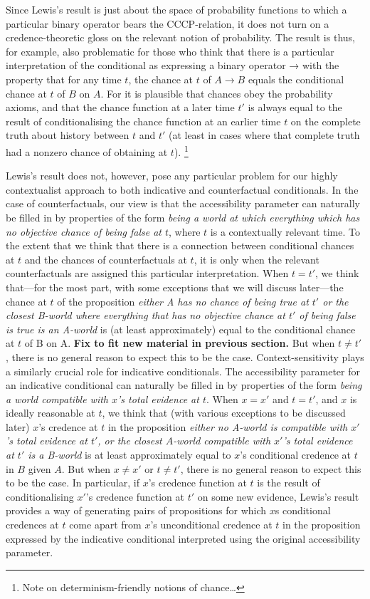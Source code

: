\documentclass[leqno, 11pt, a5paper, openany]{article}
\begin{document}
Since Lewis's result is just about the space of probability functions to which a particular binary operator bears the CCCP-relation, it does not turn on a credence-theoretic gloss on the relevant notion of probability. The result is thus, for example, also problematic for those who think that there is a particular interpretation of the conditional as expressing a binary operator → with the property that for any time $t$, the chance at $t$ of $A→B$ equals the conditional chance at $t$ of $B$ on $A$. For it is plausible that chances obey the probability axioms, and that the chance function at a later time $t'$ is always equal to the result of conditionalising the chance function at an earlier time $t$ on the complete truth about history between $t$ and $t'$ (at least in cases where that complete truth had a nonzero chance of obtaining at $t$).%
\footnote{Note on determinism-friendly notions of chance\ldots{}}

Lewis's result does not, however, pose any particular problem for our highly contextualist approach to both indicative and counterfactual conditionals. In the case of counterfactuals, our view is that the accessibility parameter can naturally be filled in by properties of the form \emph{being a world at which everything which has no objective chance of being false at $t$}, where $t$ is a contextually relevant time. To the extent that we think that there is a connection between conditional chances at $t$ and the chances of counterfactuals at $t$, it is only when the relevant counterfactuals are assigned this particular interpretation. When $t=t'$, we think that---for the most part, with some exceptions that we will discuss later---the chance at $t$ of the proposition \emph{either A has no chance of being true at $t'$ or the closest B-world where everything that has no objective chance at $t'$ of being false is true is an A-world} is (at least approximately) equal to the conditional chance at $t$ of B on A. \textbf{Fix to fit new material in previous section.}  But when $t≠t'$, there is no general reason to expect this to be the case. Context-sensitivity plays a similarly crucial role for indicative conditionals. The accessibility parameter for an indicative conditional can naturally be filled in by properties of the form \emph{being a world compatible with $x$'s total evidence at $t$}. When $x = x'$ and $t = t'$, and $x$ is ideally reasonable at $t$, we think that (with various exceptions to be discussed later) $x$'s credence at $t$ in the proposition \emph{either no A-world is compatible with $x'$'s total evidence at $t'$, or the closest $A$-world compatible with $x'$'s total evidence at $t'$ is a B-world} is at least approximately equal to $x$'s conditional credence at $t$ in $B$ given $A$. But when $x≠x'$ or $t≠t'$, there is no general reason to expect this to be the case. In particular, if $x$'s credence function at $t$ is the result of conditionalising $x'$'s credence function at $t'$ on some new evidence, Lewis's result provides a way of generating pairs of propositions for which $x$s conditional credences at $t$ come apart from $x$'s unconditional credence at $t$ in the proposition expressed by the indicative conditional interpreted using the original accessibility parameter.
\end{document}

